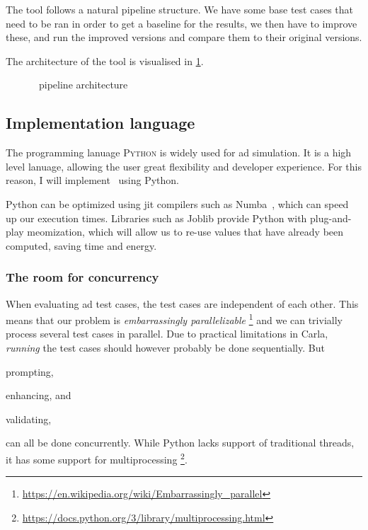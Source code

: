 The tool follows a natural pipeline structure. We have some base test cases that
need to be ran in order to get a baseline for the results, we then have to
improve these, and run the improved versions and compare them to their original
versions.

The architecture of the tool is visualised in \cref{fig:hefeArch}.

\begin{figure}[h]
    \centering
    
    \caption{\hefe~pipeline architecture}\label{fig:hefeArch}
\end{figure}

\subsection{Implementation language}

The programming lanuage \textsc{Python} is widely used for \acrfull{ad} simulation. It is a high
level lanuage, allowing the user great flexibility and developer experience. For this reason, I will
implement \hefe~using Python.

Python can be optimized using \acrfull{jit} compilers such as Numba~\cite{numba}, which can speed up
our execution times. Libraries such as Joblib provide Python with plug-and-play
meomization, which will allow us to re-use values that have already been
computed, saving time and energy.

\subsubsection{The room for concurrency}

When evaluating \acrshort{ad} test cases, the test cases are independent of each
other. This means that our problem is \textit{embarrassingly parallelizable}
\footnote{\url{https://en.wikipedia.org/wiki/Embarrassingly_parallel}} and we can
trivially process several test cases in parallel. Due to practical limitations
in Carla, \textit{running} the test cases should however probably be done
sequentially. But \begin{inparaenum}
    \item prompting,
    \item enhancing, and
    \item validating,
\end{inparaenum}
can all be done concurrently. While Python lacks support of traditional threads,
it has some support for multiprocessing
\footnote{\url{https://docs.python.org/3/library/multiprocessing.html}}.

